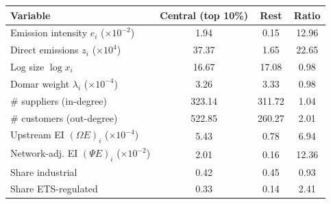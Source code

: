 \begin{tabular}{lccc}
\toprule
Variable & Central (top 10\%) & Rest & Ratio \\
\midrule
Emission intensity $e_i$ ($\times 10^{-2}$) & 1.94 & 0.15 & 12.96 \\
Direct emissions $z_i$ ($\times 10^{4}$) & 37.37 & 1.65 & 22.65 \\
Log size $\log x_i$ & 16.67 & 17.08 & 0.98 \\
Domar weight $\lambda_i$ ($\times 10^{-4}$) & 3.26 & 3.33 & 0.98 \\
\# suppliers (in-degree) & 323.14 & 311.72 & 1.04 \\
\# customers (out-degree) & 522.85 & 260.27 & 2.01 \\
Upstream EI $(\Omega E)_i$ ($\times 10^{-4}$) & 5.43 & 0.78 & 6.94 \\
Network-adj. EI $(\Psi E)_i$ ($\times 10^{-2}$) & 2.01 & 0.16 & 12.36 \\
Share industrial & 0.42 & 0.45 & 0.93 \\
Share ETS-regulated & 0.33 & 0.14 & 2.41 \\
\bottomrule
\end{tabular}
